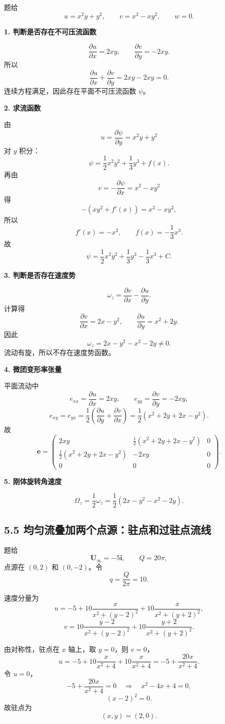 ﻿\documentclass[UTF8,zihao=-4]{ctexart}
\begin{document}
题给
\[
u=x^2y+y^2,\qquad v=x^2-xy^2,\qquad w=0 .
\]

\textbf{1. 判断是否存在不可压流函数}

\[
\frac{\partial u}{\partial x}=2xy,\qquad
\frac{\partial v}{\partial y}=-2xy .
\]
所以
\[
\frac{\partial u}{\partial x}+\frac{\partial v}{\partial y}=2xy-2xy=0.
\]
连续方程满足，因此存在平面不可压流函数 \(\psi\)。

\textbf{2. 求流函数}

由
\[
u=\frac{\partial\psi}{\partial y}=x^2y+y^2
\]
对 \(y\) 积分：
\[
\psi=\frac12x^2y^2+\frac13y^3+f(x).
\]
再由
\[
v=-\frac{\partial\psi}{\partial x}=x^2-xy^2
\]
得
\[
-\left(xy^2+f'(x)\right)=x^2-xy^2,
\]
所以
\[
f'(x)=-x^2,\qquad f(x)=-\frac13x^3.
\]
故
\[
\boxed{\psi=\frac12x^2y^2+\frac13y^3-\frac13x^3+C.}
\]

\textbf{3. 判断是否存在速度势}

\[
\omega_z=\frac{\partial v}{\partial x}-\frac{\partial u}{\partial y}.
\]
计算得
\[
\frac{\partial v}{\partial x}=2x-y^2,\qquad
\frac{\partial u}{\partial y}=x^2+2y.
\]
因此
\[
\omega_z=2x-y^2-x^2-2y\ne 0.
\]
流动有旋，所以不存在速度势函数。

\textbf{4. 微团变形率张量}

平面流动中
\[
e_{xx}=\frac{\partial u}{\partial x}=2xy,\qquad
e_{yy}=\frac{\partial v}{\partial y}=-2xy,
\]
\[
e_{xy}=e_{yx}=\frac12\left(\frac{\partial u}{\partial y}
+\frac{\partial v}{\partial x}\right)
=\frac12(x^2+2y+2x-y^2).
\]
故
\[
\boxed{
\bm e=
\begin{pmatrix}
2xy & \frac12(x^2+2y+2x-y^2) & 0\\
\frac12(x^2+2y+2x-y^2) & -2xy & 0\\
0&0&0
\end{pmatrix}.}
\]

\textbf{5. 刚体旋转角速度}

\[
\boxed{
\Omega_z=\frac12\omega_z
=\frac12(2x-y^2-x^2-2y).}
\]

\subsection*{5.5 均匀流叠加两个点源：驻点和过驻点流线}

题给
\[
\bm U_\infty=-5\bm i,\qquad Q=20\pi,
\]
点源在 \((0,2)\) 和 \((0,-2)\)。令
\[
q=\frac{Q}{2\pi}=10 .
\]

速度分量为
\[
u=-5+10\frac{x}{x^2+(y-2)^2}
+10\frac{x}{x^2+(y+2)^2},
\]
\[
v=10\frac{y-2}{x^2+(y-2)^2}
+10\frac{y+2}{x^2+(y+2)^2}.
\]

由对称性，驻点在 \(x\) 轴上，取 \(y=0\)，则 \(v=0\)，
\[
u=-5+10\frac{x}{x^2+4}+10\frac{x}{x^2+4}
=-5+\frac{20x}{x^2+4}.
\]
令 \(u=0\)，
\[
-5+\frac{20x}{x^2+4}=0
\quad\Longrightarrow\quad
x^2-4x+4=0,
\]
\[
(x-2)^2=0.
\]
故驻点为
\[
\boxed{(x,y)=(2,0).}
\]
\end{document}
